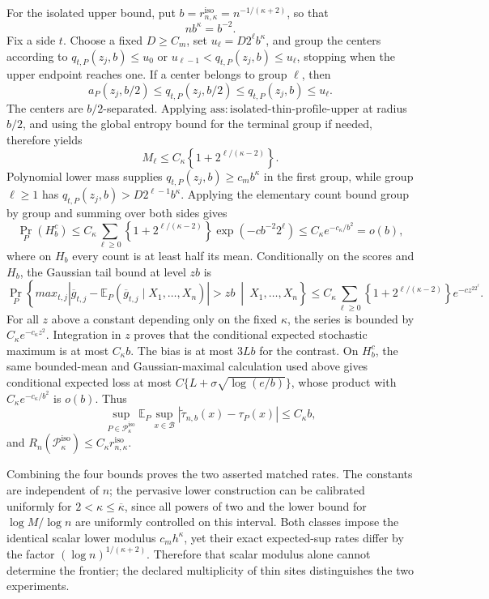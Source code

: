 For the isolated upper bound, put \(b=r_{n,\kappa}^{\mathrm{iso}}=n^{-1/(\kappa+2)}\), so that
\[
 nb^\kappa=b^{-2}.
\]
Fix a side \(t\).  Choose a fixed \(D\ge C_m\), set \(u_\ell=D2^\ell b^\kappa\), and group the centers according to \(q_{t,P}(z_j,b)\le u_0\) or \(u_{\ell-1}<q_{t,P}(z_j,b)\le u_\ell\), stopping when the upper endpoint reaches one.  If a center belongs to group \(\ell\), then
\[
 a_P(z_j,b/2)\le q_{t,P}(z_j,b/2)
 \le q_{t,P}(z_j,b)\le u_\ell.
\]
The centers are \(b/2\)-separated.  Applying \(\mathrm{ass:isolated\text{-}thin\text{-}profile\text{-}upper}\) at radius \(b/2\), and using the global entropy bound for the terminal group if needed, therefore yields
\[
 M_\ell\le C_\kappa\left\{1+2^{\ell/(\kappa-2)}\right\}.
\]
Polynomial lower mass supplies \(q_{t,P}(z_j,b)\ge c_mb^\kappa\) in the first group, while group \(\ell\ge1\) has \(q_{t,P}(z_j,b)>D2^{\ell-1}b^\kappa\).  Applying the elementary count bound group by group and summing over both sides gives
\[
 \Pr_P(H_b^c)
 \le C_\kappa\sum_{\ell\ge0}
 \left\{1+2^{\ell/(\kappa-2)}\right\}
 \exp(-c b^{-2}2^\ell)
 \le C_\kappa e^{-c_\kappa/b^2}=o(b),
\]
where on \(H_b\) every count is at least half its mean.  Conditionally on the scores and \(H_b\), the Gaussian tail bound at level \(zb\) is
\[
 \Pr_P\left\{max_{t,j}|\overline g_{t,j}-
 \mathbb E_P(\overline g_{t,j}\mid X_1,\ldots,X_n)|>zb
 \ \middle|\ X_1,\ldots,X_n\right\}
 \le C_\kappa\sum_{\ell\ge0}
 \left\{1+2^{\ell/(\kappa-2)}\right\}e^{-c z^22^\ell}.
\]
For all \(z\) above a constant depending only on the fixed \(\kappa\), the series is bounded by \(C_\kappa e^{-c_\kappa z^2}\).  Integration in \(z\) proves that the conditional expected stochastic maximum is at most \(C_\kappa b\).  The bias is at most \(3Lb\) for the contrast.  On \(H_b^c\), the same bounded-mean and Gaussian-maximal calculation used above gives conditional expected loss at most \(C\{L+\sigma\sqrt{\log(e/b)}\}\), whose product with \(C_\kappa e^{-c_\kappa/b^2}\) is \(o(b)\).  Thus
\[
 \sup_{P\in\mathcal P_\kappa^{\mathrm{iso}}}
 \mathbb E_P\sup_{x\in\mathcal B}|\widetilde\tau_{n,b}(x)-\tau_P(x)|
 \le C_\kappa b,
\]
and \(R_n(\mathcal P_\kappa^{\mathrm{iso}})\le C_\kappa r_{n,\kappa}^{\mathrm{iso}}\).

Combining the four bounds proves the two asserted matched rates.  The constants are independent of \(n\); the pervasive lower construction can be calibrated uniformly for \(2<\kappa\le\overline\kappa\), since all powers of two and the lower bound for \(\log M/\log n\) are uniformly controlled on this interval.  Both classes impose the identical scalar lower modulus \(c_mh^\kappa\), yet their exact expected-sup rates differ by the factor \((\log n)^{1/(\kappa+2)}\).  Therefore that scalar modulus alone cannot determine the frontier; the declared multiplicity of thin sites distinguishes the two experiments.